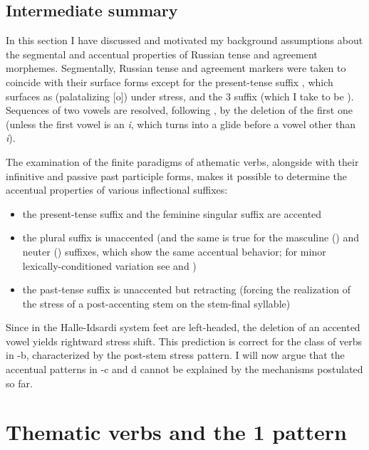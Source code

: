 \documentclass[output=paper,colorlinks,citecolor=black,koreanfont]{langscibook}
\begin{document}
\subsection{Intermediate summary}

In this section I have discussed and motivated my background assumptions about the segmental and accentual properties of Russian tense and agreement morphemes. Segmentally, Russian tense and agreement markers were taken to coincide with their surface forms except for the present-tense suffix , which surfaces as  (palatalizing [o]) under stress, and the 3{\PL} suffix (which I take to be ). Sequences of two vowels are resolved, following \citet{Jakobson1948}, by the deletion of the first one (unless the first vowel is an \textit{i}, which turns into a glide before a vowel other than \textit{i}).

The examination of the finite paradigms of athematic verbs, alongside with their infinitive and passive past participle forms, makes it possible to determine the accentual properties of various inflectional suffixes:

\begin{itemize}
    \item the present-tense suffix  and the feminine singular suffix  are accented
    \item the plural suffix  is unaccented (and the same is true for the masculine () and neuter () suffixes, which show the same accentual behavior; for minor lexically-conditioned variation see \citealt{Melvold1989} and \citealt{MarklundSharapova2000})
    \item the past-tense suffix  is unaccented but retracting (forcing the realization of the stress of a post-accenting stem on the stem-final syllable)
\end{itemize}

\noindent Since in the Halle-Idsardi system feet are left-headed, the deletion of an accented vowel yields rightward stress shift. This prediction is correct for the class of verbs in -b, characterized by the post-stem stress pattern. I will now argue that the accentual patterns in -c and d cannot be explained by the mechanisms postulated so far. 

\section{Thematic verbs and the {1\SG} pattern}\label{mat:sec:ThematicVerbs}
\end{document}
